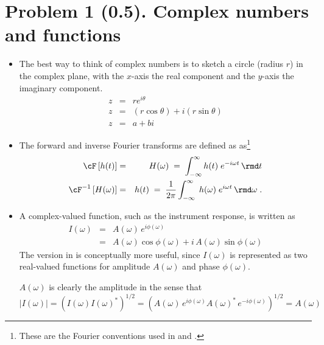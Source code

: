 \documentclass[11pt,titlepage,fleqn]{article}
\newcommand{\fft}{h}
\newcommand{\ffw}{H}
\begin{document}

\section*{Problem 1 (0.5). Complex numbers and functions}

\begin{itemize}
\item The best way to think of complex numbers is to sketch a circle (radius $r$) in the complex plane, with the $x$-axis the real component and the $y$-axis the imaginary component.
%
\begin{eqnarray*}
z &=& r e^{i\theta}
\\
z &=& (r\cos\theta) + i(r\sin\theta)
\\
z &=& a + bi
\end{eqnarray*}



\item The forward and inverse Fourier transforms are defined as as\footnote{These are the Fourier conventions used in \citet[][p.~109]{DT} and \citet[][Section 6.4.2]{SteinWysession}.}
%
\begin{eqnarray}
\cF \left[ \fft(t) \right] &=& \ffw(\omega)
\;=\; \int_{-\infty}^{\infty} \fft(t) \; e^{-i\omega t} \,\rmd t
\label{fft}
\\
\cF^{-1} \left[ \ffw(\omega) \right] &=& \fft(t) 
\;=\; \frac{1}{2\pi} \int_{-\infty}^{\infty} \; \fft(\omega) \; e^{i\omega t} \,\rmd\omega 
\label{ifft}
\;.
\end{eqnarray}


\item A complex-valued function, such as the instrument response, is written as
%
\begin{eqnarray}
I(\omega) &=& A(\omega)\,e^{i\phi(\omega)}
\label{Iw}
\\
&=& A(\omega)\cos\phi(\omega) + i\,A(\omega)\sin\phi(\omega)
\end{eqnarray}
%
The version in  is conceptually more useful, since $I(\omega)$ is represented as two real-valued functions for amplitude $A(\omega)$ and phase $\phi(\omega)$.

$A(\omega)$ is clearly the amplitude in the sense that
%
\begin{equation}
|I(\omega)| = \left( I(\omega) I(\omega)^* \right)^{1/2}
= \left( A(\omega)\,e^{i\phi(\omega)} A(\omega)^*\,e^{-i\phi(\omega)} \right)^{1/2}
= A(\omega)
\end{equation}

\end{itemize}
\end{document}
